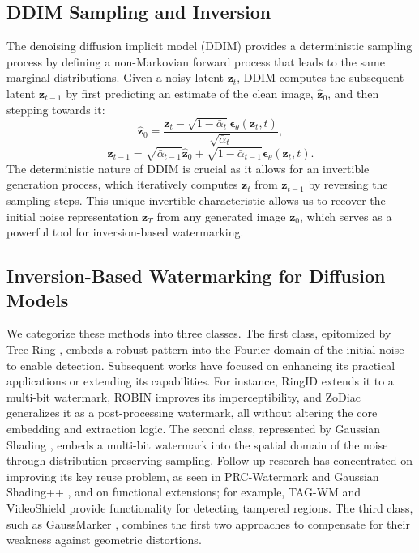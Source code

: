 \documentclass{article}
\begin{document}
\subsection{DDIM Sampling and Inversion}
\label{sec:ddim}
The denoising diffusion implicit model \citep{ddim_2021} (DDIM) provides a deterministic sampling process by defining a non-Markovian forward process that leads to the same marginal distributions. Given a noisy latent $\boldsymbol{z}_t$, DDIM computes the subsequent latent $\boldsymbol{z}_{t-1}$ by first predicting an estimate of the clean image, $\boldsymbol{\hat z}_{0}$, and then stepping towards it:
\begin{equation}
    \hat{\boldsymbol{z}}_0 = \frac{\boldsymbol{z}_t - \sqrt{1 - \bar{\alpha}_t}\boldsymbol{\epsilon}_\theta(\boldsymbol{z}_t, t)}{\sqrt{\bar{\alpha}_t}},
\end{equation}
\begin{equation}
    \boldsymbol{z}_{t-1} = \sqrt{\bar{\alpha}_{t-1}}\hat{\boldsymbol{z}}_0 + \sqrt{1 - \bar{\alpha}_{t-1}}\boldsymbol{\epsilon}_\theta(\boldsymbol{z}_t, t).
\end{equation}
The deterministic nature of DDIM is crucial as it allows for an invertible generation process, which iteratively computes $\boldsymbol{z}_t$ from $\boldsymbol{z}_{t-1}$ by reversing the sampling steps. This unique invertible characteristic allows us to recover the initial noise representation $\boldsymbol{z}_T$ from any generated image $\boldsymbol{z}_0$, which serves as a powerful tool for inversion-based watermarking.

\subsection{Inversion-Based Watermarking for Diffusion Models}
\label{sec:ibw}
We categorize these methods into three classes. The first class, epitomized by Tree-Ring \citep{treering_2023}, embeds a robust pattern into the Fourier domain of the initial noise to enable detection. Subsequent works have focused on enhancing its practical applications or extending its capabilities. For instance, RingID \citep{ringid_2024} extends it to a multi-bit watermark, ROBIN \citep{robin2024} improves its imperceptibility, and ZoDiac \citep{zodiac2024} generalizes it as a post-processing watermark, all without altering the core embedding and extraction logic. The second class, represented by Gaussian Shading \citep{gs_2024}, embeds a multi-bit watermark into the spatial domain of the noise through distribution-preserving sampling. Follow-up research has concentrated on improving its key reuse problem, as seen in PRC-Watermark \citep{prcw_2025} and Gaussian Shading++ \citep{gspp2025}, and on functional extensions; for example, TAG-WM \citep{tag_wm2025} and VideoShield \citep{videosheild_2025} provide functionality for detecting tampered regions. The third class, such as GaussMarker \citep{gaussmarker2025}, combines the first two approaches to compensate for their weakness against geometric distortions.
\end{document}
